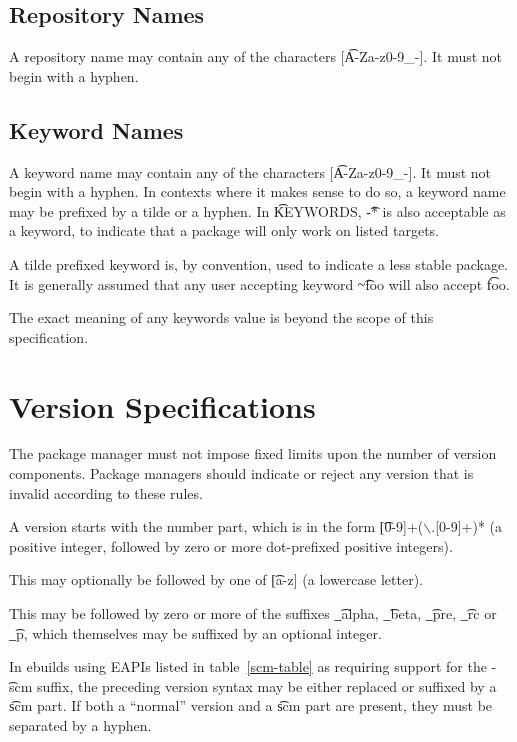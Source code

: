 \subsection{Repository Names}
\label{repository-names}
A repository name may contain any of the characters [\t{A-Za-z0-9\_-}]. It must not begin with a
hyphen.

\subsection{Keyword Names}
\label{keyword-names}
A keyword name may contain any of the characters [\t{A-Za-z0-9\_-}]. It must not begin with a
hyphen. In contexts where it makes sense to do so, a keyword name may be prefixed by
a tilde or a hyphen. In \t{KEYWORDS}, \t{-*} is also acceptable as a keyword, to indicate that
a package will only work on listed targets.

A tilde prefixed keyword is, by convention, used to indicate a less stable package. It is generally
assumed that any user accepting keyword \t{\textasciitilde{}foo} will also accept \t{foo}.

The exact meaning of any keywords value is beyond the scope of this specification.

\section{Version Specifications}
The package manager must not impose fixed limits upon the number of version components. Package managers should indicate or reject any version that is invalid according to these rules.

A version starts with the number part, which is in the form \t{[0-9]+($\backslash$.[0-9]+)*} (a positive
integer, followed by zero or more dot-prefixed positive integers).

This may optionally be followed by one of \t{[a-z]} (a lowercase letter).

This may be followed by zero or more of the suffixes \t{\_alpha}, \t{\_beta}, \t{\_pre},
\t{\_rc} or \t{\_p}, which themselves may be suffixed by an optional integer.

\IFKDEBUILDELSE
{
    \label{scm-versions} In ebuilds using EAPIs listed in table~\ref{scm-table} as requiring support
    for the \t{-scm} suffix, the preceding version syntax may be either replaced or suffixed by a
    \t{scm} part. If both a ``normal'' version and a \t{scm} part are present, they must be
    separated by a hyphen.
}{
}

